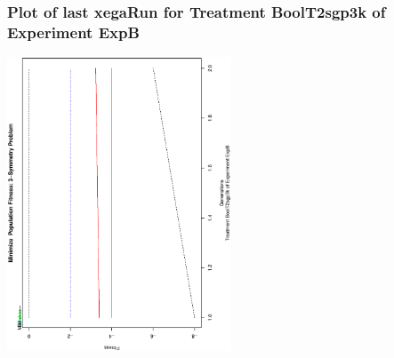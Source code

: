  \begin{frame}
 \frametitle{ Plot of last xegaRun for Treatment BoolT2sgp3k of Experiment ExpB }
 \begin{center}
\includegraphics[width=0.5\textwidth, angle=-90]
{ExpBPlotPopStatsFigure011.eps}
 \end{center}
 \label{report/ExpBPlotPopStatsFigure011.eps}  
 \end{frame}

